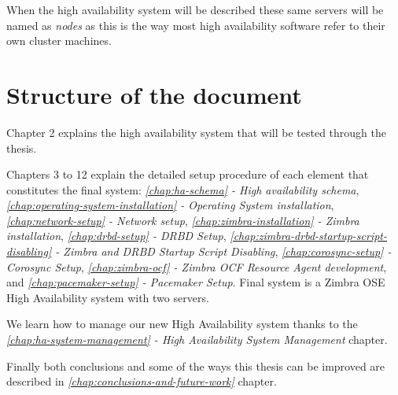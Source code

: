 When the high availability system will be described these same servers will be named as \textit{nodes} as this is the way most high availability software refer to their own cluster machines.

\section {Structure of the document}

Chapter 2 explains the high availability system that will be tested through the thesis.

Chapters 3 to 12 explain the detailed setup procedure of each element that constitutes the final system: \textit{\ref{chap:ha-schema} - High availability schema},
\textit{\ref{chap:operating-system-installation} - Operating System installation},
\textit{\ref{chap:network-setup} - Network setup},
\textit{\ref{chap:zimbra-installation} - Zimbra installation},
\textit{\ref{chap:drbd-setup} - DRBD Setup},
\textit{\ref{chap:zimbra-drbd-startup-script-disabling} - Zimbra and DRBD Startup Script Disabling},
\textit{\ref{chap:corosync-setup} - Corosync Setup},
\textit{\ref{chap:zimbra-ocf} - Zimbra OCF Resource Agent development},
and
\textit{\ref{chap:pacemaker-setup} - Pacemaker Setup}.
Final system is a Zimbra OSE High Availability system with two servers.

We learn how to manage our new High Availability system thanks to the \textit{\ref{chap:ha-system-management} - High Availability System Management} chapter.

Finally both conclusions and some of the ways this thesis can be improved are described in \textit{\ref{chap:conclusions-and-future-work}} chapter.

